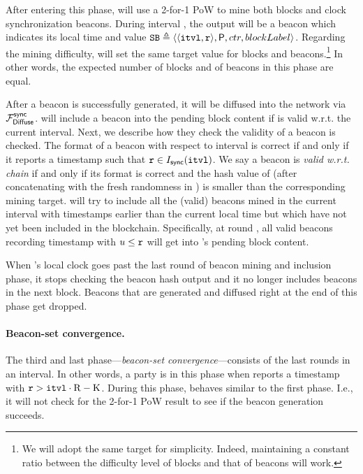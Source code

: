 After entering this phase, \party will use a 2-for-1 PoW to mine both blocks and clock synchronization beacons.
%
During interval \interval, the output will be a beacon which indicates its local time and value $\mathtt{SB} \triangleq \langle \langle \mathtt{itvl}, \mathtt{r} \rangle, \mathsf{P}, ctr, blockLabel \rangle$.
%
Regarding the mining difficulty, \timekeeper will set the same target value for blocks and beacons.\footnote{We will adopt the same target for simplicity. Indeed, maintaining a constant ratio between the difficulty level of blocks and that of beacons will work.}
%
In other words, the expected number of blocks and of beacons in this phase are
equal.

After a beacon is successfully generated, it will be diffused into the network via $\mathcal{F}_{\mathsf{Diffuse}}^{\mathsf{sync}}$.
%
\party will include a beacon \beacon into the pending block content if \beacon is valid w.r.t. the current interval.
%
Next, we describe how they check the validity of a beacon is checked.
%
The format of a beacon \beacon with respect to interval \interval is correct if and only if it reports a timestamp \protocolTime{\interval}{\round} such that $\mathtt{r} \in I_{\mathsf{sync}}({\mathtt{itvl}})$.
%
We say a beacon \beacon is \emph{valid w.r.t. chain \chain} if and only if its format is correct and the hash value of \beacon (after concatenating with the fresh randomness in \chain) is smaller than the corresponding mining target.
%
\party will try to include all the (valid) beacons mined in the current interval \interval with timestamps earlier than the current local time but which have not yet been included in the blockchain.
%
Specifically, at round \protocolTime{\interval}{\round}, all valid beacons recording timestamp  with $u \le \mathtt{r}$ will get into \party's pending block content.

When \party's local clock goes past the last round of beacon mining and inclusion phase, it stops checking the beacon hash output and it no longer includes beacons in the next block. Beacons that are generated and diffused right at the end of this phase get dropped.

\paragraph{Beacon-set convergence.}
%
The third and last phase---\emph{beacon-set convergence}---consists of the last \CPLen rounds in an interval.
%
In other words, a party \party is in this phase when \party reports a timestamp
\protocolTime{\interval}{\round} with $\mathtt{r} > \mathtt{itvl} \cdot \mathrm{R} - \mathrm{K}$.
%
During this phase, \party behaves similar to the first phase.
%
I.e., it will not check for the 2-for-1 PoW result to see if the beacon generation succeeds.

